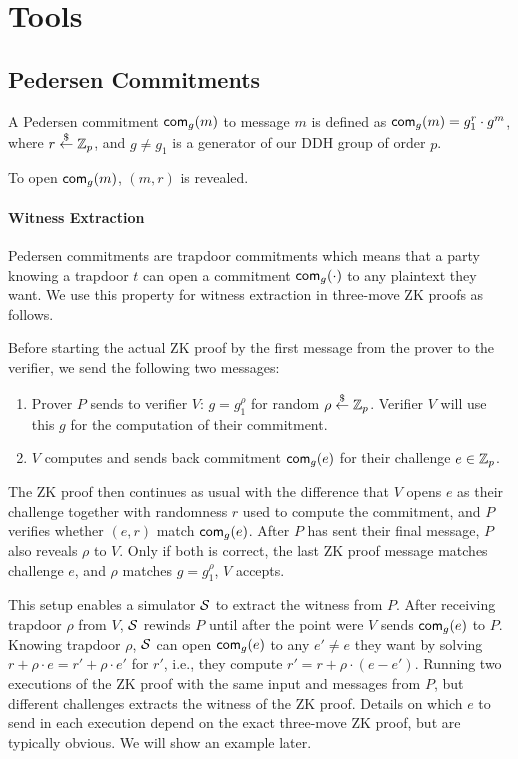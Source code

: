 \documentclass{article}
\begin{document}
\section{Tools}
\subsection{Pedersen Commitments}
A Pedersen commitment $\mathsf{com}_{g}(m)$ to message $m$ is defined as
$\mathsf{com}_{g}(m)=g_1^r\cdot{}g^m$, where $r\stackrel{\$}{\leftarrow}\mathbb{Z}_p$, and $g\neq{}g_1$ is
a generator of our DDH group of order $p$.

To open $\mathsf{com}_{g}(m)$, $(m,r)$ is revealed.

\paragraph{Witness Extraction}
Pedersen commitments are trapdoor commitments which means that a party
knowing a trapdoor $t$ can open a commitment $\mathsf{com}_g(\cdot)$ to any
plaintext they want.  We use this property for witness extraction in
three-move ZK proofs as follows.

Before starting the actual ZK proof by the first message from the
prover to the verifier, we send the following two messages:
\begin{enumerate}
\item Prover $P$ sends to verifier $V$: $g=g_1^\rho$ for random
  $\rho\stackrel{\$}{\leftarrow}\mathbb{Z}_p$. Verifier $V$ will use this $g$ for the computation
  of their commitment.
  \item $V$ computes and sends back commitment $\mathsf{com}_g(e)$ for their
    challenge $e\in\mathbb{Z}_p$.
\end{enumerate}

The ZK proof then continues as usual with the difference that $V$
opens $e$ as their challenge together with randomness $r$ used to
compute the commitment, and $P$ verifies whether $(e,r)$ match
$\mathsf{com}_g(e)$.  After $P$ has sent their final message, $P$ also reveals
$\rho$ to $V$. Only if both is correct, the last ZK proof message
matches  challenge $e$, and $\rho$ matches $g=g_1^\rho$, $V$ accepts.

This setup enables a simulator ${\mathcal{S}}$ to extract the witness from
$P$. After receiving trapdoor $\rho$ from $V$, ${\mathcal{S}}$ rewinds $P$ until
after the point were $V$ sends $\mathsf{com}_g(e)$ to $P$. Knowing trapdoor
$\rho$, ${\mathcal{S}}$ can open $\mathsf{com}_g(e)$ to any $e'\neq{}e$ they want by
solving $r+\rho\cdot{}e=r'+\rho\cdot{}e'$ for $r'$, i.e., they compute
$r'=r+\rho\cdot{}(e-e')$. Running two executions of the ZK proof with the
same input and messages from $P$, but different challenges extracts
the witness of the ZK proof. Details on which $e$ to send in each
execution depend on the exact three-move ZK proof, but are typically
obvious. We will show an example later.
\end{document}
